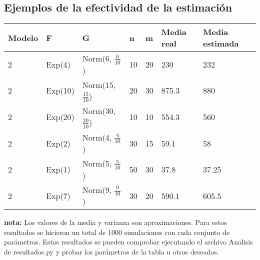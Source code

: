 \documentclass[11pt]{article}
\begin{document}
    \subsection{Ejemplos de la efectividad de la estimación}
    \begin{table}[h]
        \begin{tabular}{|l|l|l|l|l|l|l|}
            \hline \textbf{Modelo} & \textbf{F} & \textbf{G} & \textbf{n} & \textbf{m} & \textbf{Media real} & \textbf{Media estimada} \\ 
            \hline 2 & Exp(4) & Norm(6, $\frac{6}{10}$) & 10 & 20 & 230 & 232 \\
            \hline 2 & Exp(10) & Norm(15, $\frac{15}{10}$) & 20 & 30 & 875.3 & 880 \\
            \hline 2 & Exp(20) & Norm(30, $\frac{30}{10}$) & 10 & 10 & 554.3 & 560 \\
            \hline 2 & Exp(2) & Norm(4, $\frac{4}{10}$) & 30 & 15 & 59.1 & 58 \\
            \hline 2 & Exp(1) & Norm(5, $\frac{5}{10}$) & 50 & 30 & 37.8 & 37.25 \\
            \hline 2 & Exp(7) & Norm(9, $\frac{9}{10}$) & 30 & 20 & 590.1 & 605.5 \\
            \hline
        \end{tabular}
    \end{table}
    \noindent \textbf{nota:} Los valores de la media y varianza son aproximaciones. Para estos resultados se hicieron un total de 1000 
    simulaciones con cada conjunto de parámetros. Estos resultados se pueden comprobar ejecutando el archivo Analisis de resultados.py 
    y probar los parámetros de la tabla u otros deseados.
\end{document}

